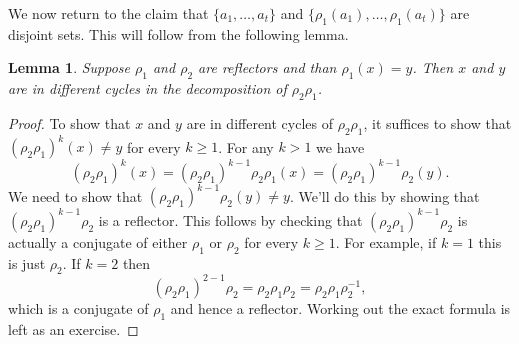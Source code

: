 \documentclass[11pt]{article}
\newtheorem{lemma}{Lemma}
\begin{document}
We now return to the claim that $\{a_1,\ldots,a_t\}$ and 
$\{\rho_1(a_1),\ldots,\rho_1(a_t)\}$
are disjoint sets. 
This will follow from the following lemma. 
\begin{lemma}
    Suppose $\rho_1$ and $\rho_2$ are reflectors and than $\rho_1(x)=y$.
    Then $x$ and $y$ are in different cycles in the decomposition of
    $\rho_2\rho_1$.
\end{lemma}
\begin{proof}
    To show that $x$ and $y$ are in different cycles of $\rho_2\rho_1$, it
    suffices to show that $(\rho_2\rho_1)^k(x) \neq y$ for every $k\geq 1$.
    For any $k>1$ we have
    \[
        (\rho_2\rho_1)^k(x)
        = (\rho_2\rho_1)^{k-1}\rho_2\rho_1(x)
        = (\rho_2\rho_1)^{k-1}\rho_2(y).
    \]
    We need to show that $(\rho_2\rho_1)^{k-1}\rho_2(y)\neq y$. We'll do this
    by showing that $(\rho_2\rho_1)^{k-1}\rho_2$ is a reflector.
    This follows by checking that $(\rho_2\rho_1)^{k-1}\rho_2$ is actually
    a conjugate of either $\rho_1$ or $\rho_2$ for every $k\geq 1$. For
    example, if $k=1$ this is just $\rho_2$. If $k=2$ then
    \[
        (\rho_2\rho_1)^{2-1}\rho_2 = \rho_2\rho_1\rho_2 = 
         \rho_2\rho_1\rho_2^{-1}, 
    \]
    which is a conjugate of $\rho_1$ and hence a reflector. Working out
    the exact formula is left as an exercise.
\end{proof}
\end{document}
